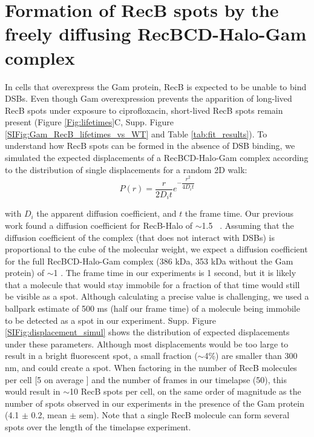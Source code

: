 \section{Formation of RecB spots by the freely diffusing RecBCD-Halo-Gam complex}
\label{note:spurious_spots}
In cells that overexpress the Gam protein, RecB is expected to be unable to bind DSBs. Even though Gam overexpression prevents the apparition of long-lived RecB spots under exposure to ciprofloxacin, short-lived RecB spots remain present (Figure \ref{Fig:lifetimes}C, Supp. Figure \ref{SIFig:Gam_RecB_lifetimes_vs_WT} and Table \ref{tab:fit_results}). To understand how RecB spots can be formed in the absence of DSB binding, we simulated the expected displacements of a RecBCD-Halo-Gam complex according to the distribution of single displacements for a random 2D walk:
\begin{equation}
    P(r) = \dfrac{r}{2D_i t}e^{-\dfrac{r^2}{4D_i t}}
\end{equation}

with $D_i$ the apparent diffusion coefficient, and $t$ the frame time. Our previous work found a diffusion coefficient for RecB-Halo of $\sim$1.5 \ums\ \cite{Lepore2023}. Assuming that the diffusion coefficient of the complex (that does not interact with DSBs) is proportional to the cube of the molecular weight, we expect a diffusion coefficient for the full RecBCD-Halo-Gam complex (386 kDa, 353 kDa without the Gam protein) of $\sim$1 \ums. The frame time in our experiments is 1 second, but it is likely that a molecule that would stay immobile for a fraction of that time would still be visible as a spot. Although calculating a precise value is challenging, we used a ballpark estimate of 500 ms (half our frame time) of a molecule being immobile to be detected as a spot in our experiment. Supp. Figure \ref{SIFig:displacement_simul} shows the distribution of expected displacements under these parameters. Although most displacements would be too large to result in a bright fluorescent spot, a small fraction ($\sim$4\%) are smaller than 300 nm, and could create a spot. When factoring in the number of RecB molecules per cell [5 on average \cite{Lepore2019a}] and the number of frames in our timelapse (50), this would result in $\sim$10 RecB spots per cell, on the same order of magnitude as the number of spots observed in our experiments in the presence of the Gam protein (4.1 $\pm$ 0.2, mean $\pm$ sem). Note that a single RecB molecule can form several spots over the length of the timelapse experiment.

